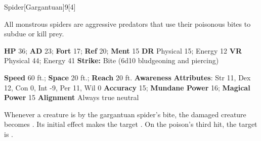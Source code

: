   \begin{monsection}{Spider}[Gargantuan]{9}[4]
    \vspace{-1em}\vspace{-1em}
    \vspace{0em}

    
    All monstrous spiders are aggressive predators that use their poisonous bites to subdue or kill prey.
  
    

    \begin{spellcontent}
      \begin{spelltargetinginfo}
        \pari \textbf{HP} 36;
          \textbf{AD} 23;
          \textbf{Fort} 17;
          \textbf{Ref} 20;
          \textbf{Ment} 15
        \pari \textbf{DR} Physical 15; Energy 12
        \pari \textbf{VR} Physical 44; Energy 41
        \pari \textbf{Strike:}
            Bite  (6d10 bludgeoning and piercing)
      \end{spelltargetinginfo}
    \end{spellcontent}
    \begin{monsterfooter}
      \pari \textbf{Speed} 60 ft.;
        \textbf{Space} 20 ft.;
        \textbf{Reach} 20 ft.
      \pari \textbf{Awareness} 
      \pari \textbf{Attributes}:
        Str 11, Dex 12,
        Con 0, Int -9,
        Per 11, Wil 0
      \pari \textbf{Accuracy} 15;
        \textbf{Mundane Power} 16;
      \textbf{Magical Power} 15
      \pari \textbf{Alignment} Always true neutral
    \end{monsterfooter}
  \end{monsection}
    Whenever a creature is  by the gargantuan spider's bite,
      the damaged creature becomes .
    Its initial effect makes the target .
    On the poison's third hit, the target is .
  

